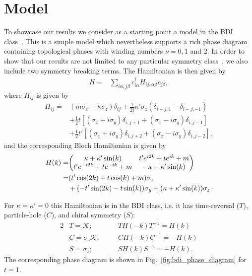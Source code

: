 \documentclass[twocolumn,amsmath,longbibliography,amssymb,superscriptaddress]{revtex4-1}
\begin{document}
\section{Model}
To showcase our results we consider as a starting point a model in the BDI class~\cite{Song2014}. 
This is a simple model which nevertheless supports a rich phase diagram containing topological phases with winding numbers $\nu =0,1$ and $2$. 
In order to show that our results are not limited to any particular symmetry class~\cite{ryu2010topological}, we also include two symmetry breaking terms. 
The Hamiltonian is then given by
\begin{align}
H =& \sum_{i\alpha,j\beta} c_{i\alpha}^\dagger H_{ij,\alpha \beta} c_{j\beta},
\end{align}
where $H_{ij} $ is given by 
\begin{align}
H_{ij} =& (m \sigma_x + \kappa \sigma_z)\delta_{ij}  + \frac{1}{2i}\kappa'\sigma_z (\delta_{i-j,1}-\delta_{i-j,-1})\nonumber\\
&+ \frac{1}{2} t \left[(\sigma_x + i \sigma_y)\delta_{i,j+1} + (\sigma_x - i \sigma_y) \delta_{i,j-1} \right] \nonumber\\
&+  \frac{1}{2} t' \left[(\sigma_x + i \sigma_y)\delta_{i,j+2} + (\sigma_x - i \sigma_y) \delta_{i,j-2} \right],
\label{bdi_model}
\end{align}
and the corresponding Bloch Hamiltonian is given by
\begin{align}
H(k)=&\mqty( \kappa + \kappa' \sin(k) & t' e^{i2k} + t e^{ik}+m \nonumber\\t' e^{-i2k} + t e^{-ik}+m & -\kappa-\kappa' \sin(k)  )\nonumber \\
=& (t' \cos(2k)+t\cos(k)+m)\sigma_x \\
&+ (-t' \sin(2k)-t\sin(k))\sigma_y + (\kappa+\kappa'\sin(k)) \sigma_z.\nonumber
\end{align}

For $\kappa = \kappa' = 0$ this Hamiltonian is in the BDI class, i.e. it has time-reversal ($T$), particle-hole ($C$), and chiral symmetry ($S$):
\begin{alignat}{2}
&T = \mathcal{K} ; \quad &&T H(-k) T^{-1} = H(k) \nonumber\\
&C = \sigma_z\mathcal{K} ; \quad &&C H(-k) C^{-1} = -H(k) \nonumber\\
&S = \sigma_z ; \quad &&S H(k)S^{-1} = -H(k) .
\end{alignat}
The corresponding phase diagram \cite{Song2014} is shown in Fig.~\ref{fig:bdi_phase_diagram} for $t=1$. 
\end{document}
